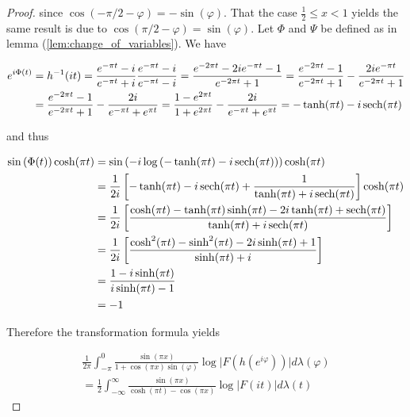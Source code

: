 \begin{proof}
	since $\cos\left( -\pi/2 - \varphi \right) = -\sin(\varphi)$. That the case $\frac{1}{2} \leqslant x < 1$ yields the same result is due to $\cos(\pi/2 - \varphi) = \sin(\varphi)$. Let $\Phi$ and $\Psi$ be defined as in lemma (\ref{lem:change_of_variables}). We have 
				
\begin{gather*}
	\begin{aligned}
		e^{i\Phi(t)} &= h^{-1}(it) = \frac{e^{-\pi t} - i}{e^{-\pi t} + i} \frac{e^{-\pi t} - i}{e^{-\pi t} - i} = \frac{e^{-2\pi t} - 2ie^{-\pi t} - 1}{e^{-2\pi t} + 1} = \frac{e^{-2\pi t} - 1}{e^{-2\pi t} + 1} - \frac{2ie^{-\pi t}}{e^{-2\pi t} + 1}\\ 
		&= \frac{e^{-2\pi t} - 1}{e^{-2\pi t} + 1} - \frac{2i}{e^{-\pi t} + e^{\pi t}} = \frac{1 - e^{2\pi t}}{1 + e^{2\pi t}} - \frac{2i}{e^{-\pi t} + e^{\pi t}} = -\tanh (\pi t) - i \operatorname{sech}(\pi t)
	\end{aligned}
\end{gather*}
	
and thus

\begin{gather*}
	\begin{aligned}
		\sin\left( \Phi(t) \right)\cosh(\pi t) &= \sin\left( -i\log\left( -\tanh (\pi t) - i \operatorname{sech}(\pi t) \right)\right) \cosh(\pi t)\\
		&= \frac{1}{2i} \left[ -\tanh(\pi t) - i\operatorname{sech}(\pi t) + \frac{1}{\tanh(\pi t) + i\operatorname{sech}(\pi t) }\right]\cosh(\pi t)\\
		&= \frac{1}{2i} \left[ \frac{\cosh(\pi t) - \tanh(\pi t) \sinh(\pi t) - 2i\tanh(\pi t) + \operatorname{sech}(\pi t)}{\tanh(\pi t) + i\operatorname{sech}(\pi t)}\right]\\
		&= \frac{1}{2i} \left[ \frac{\cosh^2(\pi t) - \sinh^2(\pi t) - 2i \sinh(\pi t) + 1}{\sinh(\pi t) + i}\right]\\
		&= \frac{1 - i\sinh(\pi t)}{i\sinh(\pi t) - 1}\\
		&= -1
	\end{aligned}
\end{gather*}

Therefore the transformation formula yields

\begin{multline}
	\frac{1}{2\pi} \int_{-\pi}^0 \frac{\sin(\pi x)}{1 + \cos(\pi x)\sin(\varphi)} \log \vert F(h(e^{i\varphi}))\vert d\lambda(\varphi)\\ = \frac{1}{2}\int_{-\infty}^\infty\frac{\sin(\pi x)}{\cosh(\pi t) - \cos(\pi x)} \log\vert F(it) \vert d\lambda(t)
\end{multline}
				

\end{proof}
